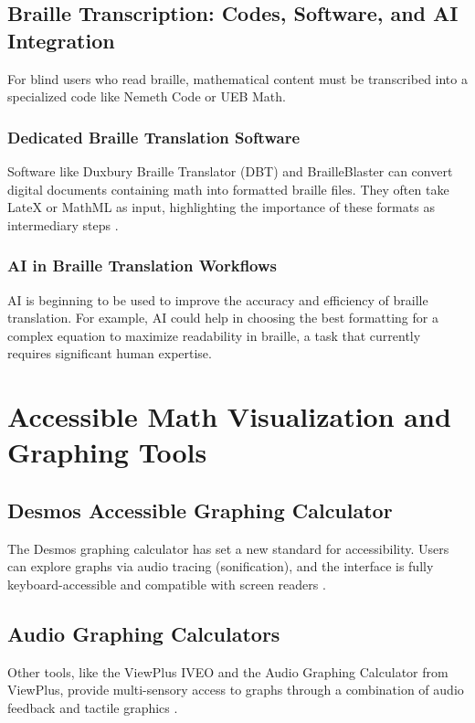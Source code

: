 \subsection{Braille Transcription: Codes, Software, and AI Integration}\label{ch11:ssec:braille}
For blind users who read braille, mathematical content must be transcribed into a specialized code like Nemeth Code or UEB Math.

\subsubsection{Dedicated Braille Translation Software}\label{ch11:sssec:braille-software}
Software like Duxbury Braille Translator (DBT) and BrailleBlaster can convert digital documents containing math into formatted braille files. They often take \gls{LateX} or \gls{MathML} as input, highlighting the importance of these formats as intermediary steps \supercite{Duxbury, BrailleBlaster}.

\subsubsection{AI in Braille Translation Workflows}\label{ch11:sssec:ai-braille}
\gls{AI} is beginning to be used to improve the accuracy and efficiency of braille translation. For example, \gls{AI} could help in choosing the best formatting for a complex equation to maximize readability in braille, a task that currently requires significant human expertise.

\section{Accessible Math Visualization and Graphing Tools}\label{ch11:sec:visualization}
\subsection{Desmos Accessible Graphing Calculator}\label{ch11:ssec:desmos}
The Desmos graphing calculator has set a new standard for accessibility. Users can explore graphs via audio tracing (sonification), and the interface is fully keyboard-accessible and compatible with screen readers \supercite{Desmos}.

\subsection{Audio Graphing Calculators}\label{ch11:ssec:audio-graphing}
Other tools, like the ViewPlus IVEO and the Audio Graphing Calculator from ViewPlus, provide multi-sensory access to graphs through a combination of audio feedback and tactile graphics \supercite{ViewPlusAGC}.

